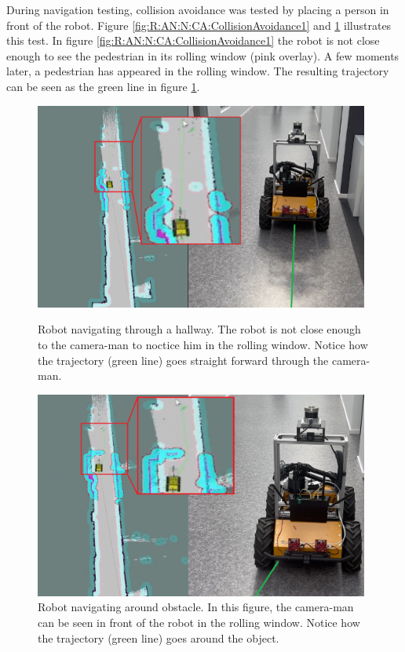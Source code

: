 During navigation testing, collision avoidance was tested by placing a person in front of the robot. Figure \ref{fig:R:AN:N:CA:CollisionAvoidance1} and \ref{fig:R:AN:N:CA:collisionAvoidance2} illustrates this test. In figure \ref{fig:R:AN:N:CA:CollisionAvoidance1} the robot is not close enough to see the pedestrian in its rolling window (pink overlay). A few moments later, a pedestrian has appeared in the rolling window. The resulting trajectory can be seen as the green line in figure \ref{fig:R:AN:N:CA:collisionAvoidance2}.

\begin{figure}[H]
  \centering
  \begin{minipage}[b]{0.49\textwidth}
  \centering
    \includegraphics[width = 0.98\textwidth]{Figures/figuiaCollisionAvoidMerged1.png}
    \caption{Robot navigating through a hallway. The robot is not close enough to the camera-man to noctice him in the rolling window. Notice how the trajectory (green line) goes straight forward through the camera-man.}
    \label{fig:R:AN:N:CA:CollisionAvoidance1}
  \end{minipage}
  \hfill
  \begin{minipage}[b]{0.49\textwidth}
    \centering
    \includegraphics[width = 0.98\textwidth]{Figures/figuiaCollisionAvoidMerged2.png}
    \caption{Robot navigating around obstacle. In this figure, the camera-man can be seen in front of the robot in the rolling window. Notice how the trajectory (green line) goes around the object.}
    \label{fig:R:AN:N:CA:collisionAvoidance2}
  \end{minipage}
\end{figure}


